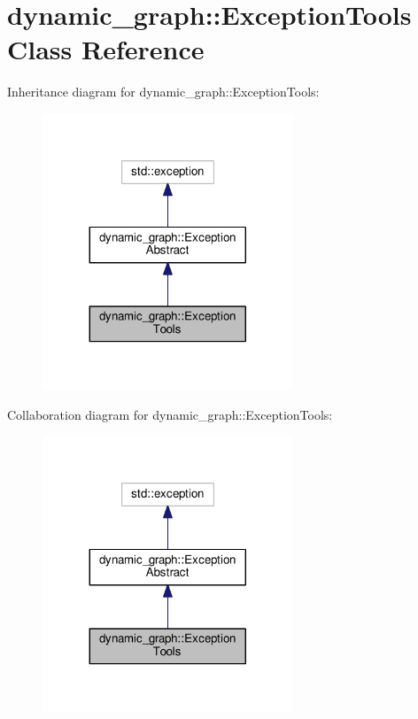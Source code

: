 \hypertarget{classdynamic__graph_1_1ExceptionTools}{}\section{dynamic\+\_\+graph\+:\+:Exception\+Tools Class Reference}
\label{classdynamic__graph_1_1ExceptionTools}


Inheritance diagram for dynamic\+\_\+graph\+:\+:Exception\+Tools\+:
\nopagebreak
\begin{figure}[H]
\begin{center}
\leavevmode
\includegraphics[width=212pt]{classdynamic__graph_1_1ExceptionTools__inherit__graph}
\end{center}
\end{figure}


Collaboration diagram for dynamic\+\_\+graph\+:\+:Exception\+Tools\+:
\nopagebreak
\begin{figure}[H]
\begin{center}
\leavevmode
\includegraphics[width=212pt]{classdynamic__graph_1_1ExceptionTools__coll__graph}
\end{center}
\end{figure}

